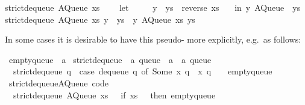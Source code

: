 \begin{isabellebody}
\begin{isamarkuptext}
strict{\isacharunderscore}dequeue\ {\isacharparenleft}AQueue\ xs\ {\isacharbrackleft}{\isacharbrackright}{\isacharparenright}\ {\isacharequal}\isanewline
\ \ let\ {\isacharbraceleft}\isanewline
\ \ \ \ {\isacharparenleft}y\ {\isacharcolon}\ ys{\isacharparenright}\ {\isacharequal}\ reverse\ xs{\isacharsemicolon}\isanewline
\ \ {\isacharbraceright}\ in\ {\isacharparenleft}y{\isacharcomma}\ AQueue\ {\isacharbrackleft}{\isacharbrackright}\ ys{\isacharparenright}{\isacharsemicolon}\isanewline
strict{\isacharunderscore}dequeue\ {\isacharparenleft}AQueue\ xs\ {\isacharparenleft}y\ {\isacharcolon}\ ys{\isacharparenright}{\isacharparenright}\ {\isacharequal}\ {\isacharparenleft}y{\isacharcomma}\ AQueue\ xs\ ys{\isacharparenright}{\isacharsemicolon}\isanewline%
\end{isamarkuptext}%
\isamarkuptrue%
%
\endisatagtypewriter
{\isafoldtypewriter}%
%
\isadelimtypewriter
%
\endisadelimtypewriter
%
\begin{isamarkuptext}%
\noindent In some cases it is desirable to have this
  pseudo- more explicitly, e.g.~as follows:%
\end{isamarkuptext}%
\isamarkuptrue%
%
\isadelimquote
%
\endisadelimquote
%
\isatagquote
{}\isamarkupfalse%
\ empty{\isacharunderscore}queue\ {\isacharcolon}{\isacharcolon}\ {\isacharprime}a\isanewline
\isanewline
{}\isamarkupfalse%
\ strict{\isacharunderscore}dequeue{\isacharprime}\ {\isacharcolon}{\isacharcolon}\ {\isachardoublequoteopen}{\isacharprime}a\ queue\ {\isasymRightarrow}\ {\isacharprime}a\ {\isasymtimes}\ {\isacharprime}a\ queue{\isachardoublequoteclose}\ \isanewline
\ \ {\isachardoublequoteopen}strict{\isacharunderscore}dequeue{\isacharprime}\ q\ {\isacharequal}\ {\isacharparenleft}case\ dequeue\ q\ of\ {\isacharparenleft}Some\ x{\isacharcomma}\ q{\isacharprime}{\isacharparenright}\ {\isasymRightarrow}\ {\isacharparenleft}x{\isacharcomma}\ q{\isacharprime}{\isacharparenright}\ {\isacharbar}\ {\isacharunderscore}\ {\isasymRightarrow}\ empty{\isacharunderscore}queue{\isacharparenright}{\isachardoublequoteclose}\isanewline
\isanewline
{}\isamarkupfalse%
\ strict{\isacharunderscore}dequeue{\isacharprime}{\isacharunderscore}AQueue\ {\isacharbrackleft}code{\isacharbrackright}{\isacharcolon}\isanewline
\ \ {\isachardoublequoteopen}strict{\isacharunderscore}dequeue{\isacharprime}\ {\isacharparenleft}AQueue\ xs\ {\isacharbrackleft}{\isacharbrackright}{\isacharparenright}\ {\isacharequal}\ {\isacharparenleft}if\ xs\ {\isacharequal}\ {\isacharbrackleft}{\isacharbrackright}\ then\ empty{\isacharunderscore}queue\isanewline

\end{isabellebody}
